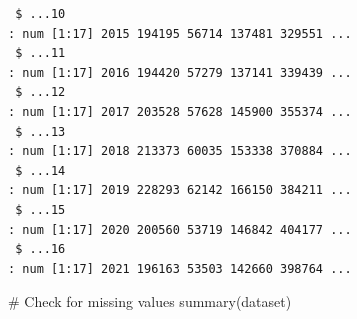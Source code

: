 \documentclass[
  letterpaper,
  DIV=11,
  numbers=noendperiod]{scrreprt}
\newenvironment{Shaded}{\begin{snugshade}}{\end{snugshade}}
\newcommand{\CommentTok}[1]{\textcolor[rgb]{0.37,0.37,0.37}{#1}}
\newcommand{\FunctionTok}[1]{\textcolor[rgb]{0.28,0.35,0.67}{#1}}
\newcommand{\NormalTok}[1]{\textcolor[rgb]{0.00,0.23,0.31}{#1}}
\begin{document}
\begin{verbatim}
 $ ...10                                                                                                                                        : num [1:17] 2015 194195 56714 137481 329551 ...
 $ ...11                                                                                                                                        : num [1:17] 2016 194420 57279 137141 339439 ...
 $ ...12                                                                                                                                        : num [1:17] 2017 203528 57628 145900 355374 ...
 $ ...13                                                                                                                                        : num [1:17] 2018 213373 60035 153338 370884 ...
 $ ...14                                                                                                                                        : num [1:17] 2019 228293 62142 166150 384211 ...
 $ ...15                                                                                                                                        : num [1:17] 2020 200560 53719 146842 404177 ...
 $ ...16                                                                                                                                        : num [1:17] 2021 196163 53503 142660 398764 ...
\end{verbatim}

\begin{Shaded}
\begin{Highlighting}[]
\CommentTok{\# Check for missing values}
\FunctionTok{summary}\NormalTok{(dataset)}
\end{Highlighting}
\end{Shaded}
\end{document}

